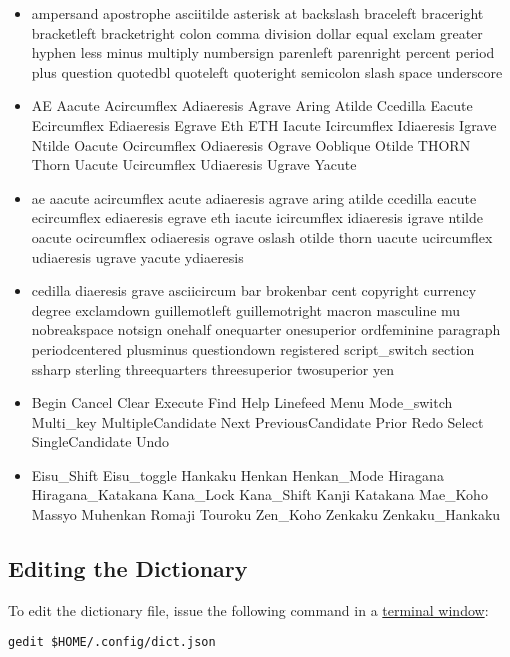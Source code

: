 \documentclass[11pt]{article}
\newcommand{\terminal}{\href{https://help.ubuntu.com/community/UsingTheTerminal}{terminal window}}
\begin{document}
\begin{itemize}
\item ampersand apostrophe asciitilde asterisk at backslash braceleft
  braceright bracketleft bracketright colon comma division dollar
  equal exclam greater hyphen less minus multiply numbersign parenleft
  parenright percent period plus question quotedbl quoteleft
  quoteright semicolon slash space underscore

\item AE Aacute Acircumflex Adiaeresis Agrave Aring Atilde Ccedilla
  Eacute Ecircumflex Ediaeresis Egrave Eth ETH Iacute Icircumflex
  Idiaeresis Igrave Ntilde Oacute Ocircumflex Odiaeresis Ograve
  Ooblique Otilde THORN Thorn Uacute Ucircumflex Udiaeresis Ugrave
  Yacute

\item ae aacute acircumflex acute adiaeresis agrave aring atilde
  ccedilla eacute ecircumflex ediaeresis egrave eth iacute icircumflex
  idiaeresis igrave ntilde oacute ocircumflex odiaeresis ograve oslash
  otilde thorn uacute ucircumflex udiaeresis ugrave yacute ydiaeresis

\item cedilla diaeresis grave asciicircum bar brokenbar cent copyright
  currency degree exclamdown guillemotleft guillemotright macron
  masculine mu nobreakspace notsign onehalf onequarter onesuperior
  ordfeminine paragraph periodcentered plusminus questiondown
  registered script\_switch section ssharp sterling threequarters
  threesuperior twosuperior yen

\item Begin Cancel Clear Execute Find Help Linefeed Menu Mode\_switch
  Multi\_key MultipleCandidate Next PreviousCandidate Prior Redo
  Select SingleCandidate Undo
  
\item Eisu\_Shift Eisu\_toggle Hankaku Henkan Henkan\_Mode Hiragana
  Hiragana\_Katakana Kana\_Lock Kana\_Shift Kanji Katakana Mae\_Koho
  Massyo Muhenkan Romaji Touroku Zen\_Koho Zenkaku Zenkaku\_Hankaku

\end{itemize}

\subsection{Editing the Dictionary}

To edit the dictionary file, issue the following command in a
\terminal:

\begin{lstlisting}
gedit $HOME/.config/dict.json
\end{lstlisting}
\end{document}
